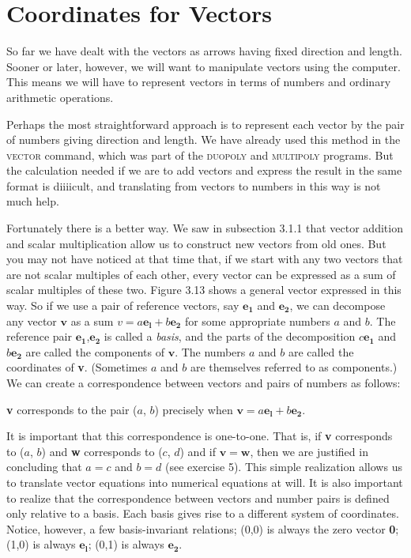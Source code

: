 \documentclass{book}
\begin{document}
\section{Coordinates for Vectors}

So far we have dealt with the vectors as arrows having fixed direction
and length. Sooner or later, however, we will want to manipulate vectors
using the computer. This means we will have to represent vectors in
terms of numbers and ordinary arithmetic operations.

Perhaps the most straightforward approach is to represent each vector
by the pair of numbers giving direction and length. We have already used
this method in the \textsc{vector} command, which was part of the \textsc{duopoly} and
\textsc{multipoly} programs. But the calculation needed if we are to add vectors
and express the result in the same format is diiiicult, and translating
from vectors to numbers in this way is not much help. 

Fortunately there is a better way. We saw in subsection 3.1.1 that
vector addition and scalar multiplication allow us to construct new
vectors from old ones. But you may not have noticed at that time that, if
we start with any two vectors that are not scalar multiples of each other,
every vector can be expressed as a sum of scalar multiples of these two.
Figure 3.13 shows a general vector expressed in this way. So if we use
a pair of reference vectors, say $\mathbf{e_1}$ and $\mathbf{e_2}$, we can decompose any vector
$\mathbf{v}$ as a sum $v = a\mathbf{e_l} + b\mathbf{e_2}$ for some appropriate numbers $a$ and $b$. The
reference pair $\mathbf{e_1}$,$\mathbf{e_2}$ is called a {\em basis}, and the parts of the decomposition
$c\mathbf{e_1}$ and $b\mathbf{e_2}$ are called the components of $\mathbf{v}$. The numbers $a$ and $b$ are
called the coordinates of \textbf{v}. (Sometimes $a$ and $b$ are themselves referred
to as components.) We can create a correspondence between vectors and
pairs of numbers as follows:

\textbf{v} corresponds to the pair ($a$, $b$) precisely when $\mathbf{v} = a\mathbf{e_l} + b\mathbf{e_2}$.

It is important that this correspondence is one-to-one. That is, if \textbf{v}
corresponds to ($a$, $b$) and \textbf{w} corresponds to ($c$, $d$) and if $\mathbf{v} = \mathbf{w}$, then
we are justified in concluding that $a = c$ and $b = d$ (see exercise
5). This simple realization allows us to translate vector equations into
numerical equations at will. It is also important to realize that the
correspondence between vectors and number pairs is defined only relative
to a basis. Each basis gives rise to a different system of coordinates.
Notice, however, a few basis-invariant relations; (0,0) is always the zero
vector \textbf{0}; (1,0) is always $\mathbf{e_l}$; (0,1) is always $\mathbf{e_2}$.
\end{document}
